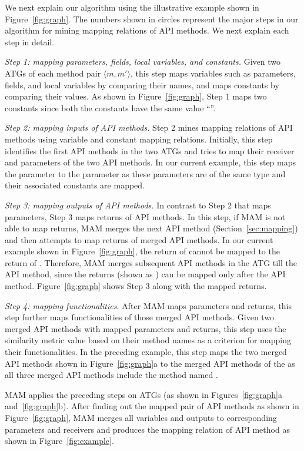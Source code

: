 We next explain our algorithm using the illustrative example shown
in Figure~\ref{fig:graph}. The numbers shown in circles
represent the major steps in our algorithm for mining mapping
relations of API methods. We next explain each step in detail.

\emph{Step 1: mapping parameters, fields, local variables, and constants.}
Given two ATGs of each method pair $\langle m, m' \rangle$, this step maps
variables such as parameters, fields, and local variables by comparing their names,
and maps constants by comparing their values. As shown in
Figure~\ref{fig:graph}, Step 1 maps two constants since both the constants
have the same value ``''.

\emph{Step 2: mapping inputs of API methods.} Step 2 mines mapping
relations of API methods using variable and constant mapping relations.
Initially, this step identifies the first API methods in the two ATGs and tries to
map their receiver and parameters of the two API methods.
In our current example, this step maps the parameter 
to the parameter  as these parameters
are of the same type and their associated constants are mapped.

\emph{Step 3: mapping outputs of API methods.} In contrast to Step 2
that maps parameters, Step 3 maps returns of API methods. In
this step, if MAM is not able to map returns, MAM merges the next API method (Section~\ref{sec:mapping}) and
then attempts to map returns of merged API methods. In our current example shown in
Figure~\ref{fig:graph}, the return of 
cannot be mapped to the return of . Therefore, MAM merges subsequent API methods in the ATG till the 
API method, since the returns (shown as ) can be mapped
only after the  API method. Figure~\ref{fig:graph}
shows Step 3 along with the mapped returns.

\emph{Step 4: mapping functionalities.} After MAM maps
parameters and returns, this step further maps functionalities
of those merged API methods. Given two merged API methods with
mapped parameters and returns, this step uses the similarity
metric value based on their method names as a criterion for mapping
their functionalities. In the preceding example, this step maps the
two merged API methods shown in Figure~\ref{fig:graph}a to the
merged API methods of the  as all
three merged API methods include the method named .

MAM applies the preceding steps on ATGs (as shown in
Figures~\ref{fig:graph}a and~\ref{fig:graph}b). After finding out
the mapped pair of API methods as shown in Figure~\ref{fig:graph},
MAM merges all variables and outputs to corresponding
parameters and receivers and produces the mapping relation of API
method as shown in Figure~\ref{fig:example}.
